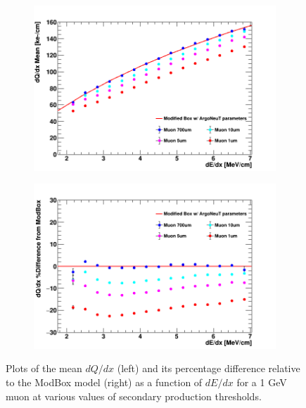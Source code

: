 \begin{figure}[htbp!]
        \begin{subfigure}[b]{0.495\textwidth}   
            \centering 
            \includegraphics[width=\textwidth]{mu_profile}
            \caption{}%
            \label{fig:mu_range_delta_magnitude}
        \end{subfigure}
        \hfill
        \begin{subfigure}[b]{0.495\textwidth}   
            \centering 
            \includegraphics[width=\textwidth]{mu_profile_diff}
            \caption{}%
            \label{fig:mu_range_delta_diff}
        \end{subfigure}
        \caption{Plots of the mean $dQ/dx$ (left) and its percentage difference relative to the ModBox model (right) as a function of $dE/dx$ for a 1 GeV muon at various values of secondary production thresholds. }
        \label{fig:mu_range_delta}
\end{figure}


